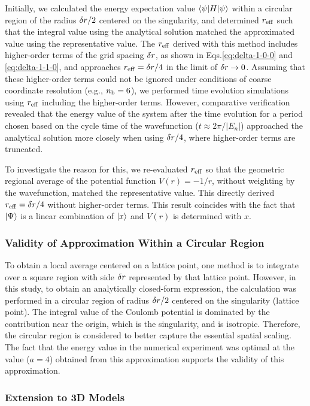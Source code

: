 \documentclass[aip-draft.tex]{subfiles}
\begin{document}
Initially, we calculated the energy expectation value $\braket{\psi|H|\psi}$
within a circular region of the radius $\delta r/2$ centered on the singularity,
and determined $r_{\mathrm{eff}}$ such that the integral value using the analytical
solution matched the approximated value using the representative value. The
$r_{\mathrm{eff}}$ derived with this method includes higher-order terms of the grid spacing
$\delta r$, as shown in Eqs.\eqref{eq:delta-1-0-0} and \eqref{eq:delta-1-1-0},
and approaches $r_{\mathrm{eff}}=\delta r/4$ in the limit of $\delta r\rightarrow0$. Assuming
that these higher-order terms could not be ignored under conditions of coarse
coordinate resolution (e.g., $n_{\mathrm{b}}=6$), we performed time evolution simulations
using $r_{\mathrm{eff}}$ including the higher-order terms. However, comparative
verification revealed that the energy value of the system after the time
evolution for a period chosen based on the cycle time of the wavefunction
($t\approx 2\pi/|E_n|$) approached the analytical solution more closely when
using $\delta r/4$, where higher-order terms are truncated.

To investigate the reason for this, we re-evaluated $r_{\mathrm{eff}}$ so that the
geometric regional average of the potential function $V(r)=-1/r$, without
weighting by the wavefunction, matched the representative value. This directly
derived $r_{\mathrm{eff}}=\delta r/4$ without higher-order terms.  This result coincides
with the fact that $\ket{\Psi}$ is a linear combination of $\ket{x}$ and $V(r)$ is
determined with $x$.

\subsubsection{Validity of Approximation Within a Circular Region}
To obtain a local average centered on a lattice point, one method is to
integrate over a square region with side $\delta r$ represented by that lattice
point. However, in this study, to obtain an analytically closed-form expression,
the calculation was performed in a circular region of radius $\delta r/2$
centered on the singularity (lattice point). The integral value of the Coulomb
potential is dominated by the contribution near the origin, which is the
singularity, and is isotropic. Therefore, the circular region is considered to
better capture the essential spatial scaling. The fact that the energy value in
the numerical experiment was optimal at the value ($a=4$) obtained from this
approximation supports the validity of this approximation.

\subsubsection{Extension to 3D Models}
\label{subsec:discussion-3d-extension}
\end{document}
